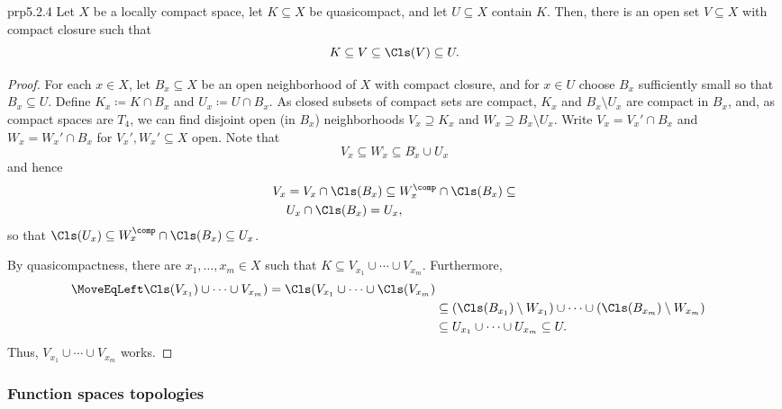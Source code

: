 \begin{prp}{}{prp5.2.4}
Let $X$ be a locally compact space, let $K\subseteq X$ be quasicompact, and let $U\subseteq X$ contain $K$.  Then, there is an open set $V\subseteq X$ with compact closure such that
\begin{equation}
K\subseteq V\subseteq \Cls (V)\subseteq U.
\end{equation}
\begin{proof}
For each $x\in X$, let $B_x\subseteq X$ be an open neighborhood of $X$ with compact closure, and for $x\in U$ choose $B_x$ sufficiently small so that $B_x\subseteq U$.  Define $K_x\coloneqq K\cap B_x$ and $U_x\coloneqq U\cap B_x$.  As closed subsets of compact sets are compact, $K_x$ and $B_x\setminus U_x$ are compact in $B_x$, and, as compact spaces are $T_4$, we can find disjoint open (in $B_x$) neighborhoods $V_x\supseteq K_x$ and $W_x\supseteq B_x\setminus U_x$.  Write $V_x=V_x'\cap B_x$ and $W_x=W_x'\cap B_x$ for $V_x',W_x'\subseteq X$ open.  Note that
\begin{equation}
V_x\subseteq W_x^{\comp}\subseteq B_x^{\comp}\cup U_x
\end{equation}
and hence
\begin{equation}
\begin{split}
V_x & =V_x\cap \Cls (B_x)\subseteq W_x^{\comp}\cap \Cls (B_x)\subseteq \\
& U_x\cap \Cls (B_x)=U_x,
\end{split}
\end{equation}
so that $\Cls (U_x)\subseteq W_x^{\comp}\cap \Cls (B_x)\subseteq U_x$.

By quasicompactness, there are $x_1,\ldots ,x_m\in X$ such that $K\subseteq V_{x_1}\cup \cdots \cup V_{x_m}$.  Furthermore,
\begin{equation}
\begin{split}
\MoveEqLeft
\Cls (V_{x_1})\cup \cdots \cup V_{x_m})=\Cls (V_{x_1}\cup \cdots \cup \Cls (V_{x_m}) \\
& \subseteq (\Cls (B_{x_1})\setminus W_{x_1})\cup \cdots \cup (\Cls (B_{x_m})\setminus W_{x_m}) \\
& \subseteq U_{x_1}\cup \cdots \cup U_{x_m}\subseteq U.
\end{split}
\end{equation}
Thus, $V_{x_1}\cup \cdots \cup V_{x_m}$ works.
\end{proof}
\end{prp}

\subsubsection{Function spaces topologies}

